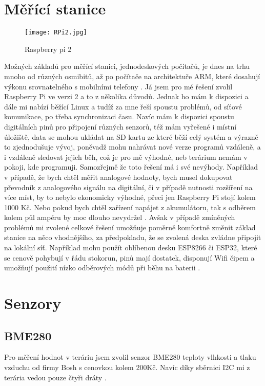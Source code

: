 
\section{Měřící stanice}
\begin{figure}[H]
    \centering
    \texttt{[image: RPi2.jpg]}
    \caption{Raspberry pi 2}
\end{figure}
Možných základů pro měřící stanici, jednodeskových počítačů, je dnes na trhu mnoho od různých osmibitů, až po počítače 
na architektuře ARM,  které dosahují výkonu srovnatelného s mobilními telefony \parencite{wiki:raspberrypi}. Já jsem pro 
mé řešení zvolil Raspberry Pi ve verzi 2 a to z několika důvodů. Jednak ho mám k dispozici a dále mi nabízí běžící Linux 
a tudíž za mne řeší spoustu problémů, od síťové komunikace, po třeba synchronizaci času. Navíc mám k dispozici spoustu 
digitálních pinů pro připojení různých senzorů, též mám vyřešené i místní úložiště, data se mohou ukládat na SD kartu ze 
které běží celý systém a výrazně to zjednodušuje vývoj, poněvadž mohu nahrávat nové verze programů vzdáleně, 
a i vzdáleně sledovat jejich běh, což je pro mě výhodné, neb terárium nemám v pokoji, kde programuji. Samozřejmě že toto 
řešení má i své nevýhody. Například v případě, že bych chtěl měřit analogové hodnoty, bych musel dokupovat převodník 
z analogového signálu na digitální, či v případě nutnosti rozšíření na více míst, by to nebylo ekonomicky výhodné, přeci 
jen Raspberry Pi stojí kolem 1000 Kč. Nebo pokud bych chtěl zařízení napájet z akumulátoru, tak s odběrem kolem půl 
ampéru by moc dlouho nevydržel \parencite{wiki:raspberrypi}. Avšak v případě zmíněných problémů mi zvolené celkové 
řešení umožňuje poměrně komfortně změnit základ stanice na něco vhodnějšího, za předpokladu, že se zvolená deska zvládne 
připojit na lokální síť. Například mohu použít oblíbenou desku ESP8266 či ESP32, které se cenově pohybují v řádu 
stokorun, pinů mají dostatek, disponují Wifi čipem a umožňují použití nízko odběrových módů při běhu na baterii 
\parencite{root.cz:ESP}.

\section{Senzory}
\subsection{BME280}
Pro měření hodnot v teráriu jsem zvolil senzor BME280 teploty vlhkosti a tlaku vzduchu od firmy Bosh s cenovkou kolem 
200Kč. Navíc díky sběrnici \gls{I2C} mi z terária vedou pouze čtyři dráty \parencite{pajenicko:BME280}.


